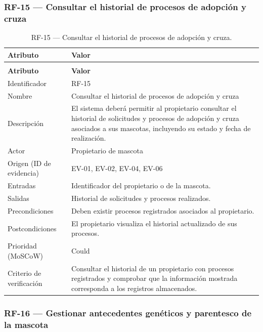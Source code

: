 \documentclass[journal,onecolumn]{IEEEtran}
\makeatletter
\newenvironment{atributos}[2]{%
	\small
	\begin{longtable}{@{}>{\raggedright\arraybackslash}p{4.2cm} >{\raggedright\arraybackslash}p{11.2cm}@{}}
		\caption{#2}\label{tab:#1}\\
		\toprule
		\textbf{Atributo} & \textbf{Valor} \\
		\midrule
		\endfirsthead
		\multicolumn{2}{@{}l}{\small\itshape (continuación)}\\
		\toprule
		\textbf{Atributo} & \textbf{Valor} \\
		\midrule
		\endhead
		\bottomrule
		\endlastfoot
	}{%
	\end{longtable}
	\normalsize
}
\makeatother
\begin{document}
	\subsubsection{RF-15 --- Consultar el historial de procesos de adopción y cruza}
	
	\begin{atributos}{RF-15}{RF-15 --- Consultar el historial de procesos de adopción y cruza.}
		Identificador & RF-15 \\
		Nombre & Consultar el historial de procesos de adopción y cruza \\
		Descripción & El sistema deberá permitir al propietario consultar el historial de solicitudes y procesos de adopción y cruza asociados a sus mascotas, incluyendo su estado y fecha de realización. \\
		Actor & Propietario de mascota \\
		Origen (ID de evidencia) & EV-01, EV-02, EV-04, EV-06 \\
		Entradas & Identificador del propietario o de la mascota. \\
		Salidas & Historial de solicitudes y procesos realizados. \\
		Precondiciones & Deben existir procesos registrados asociados al propietario. \\
		Postcondiciones & El propietario visualiza el historial actualizado de sus procesos. \\
		Prioridad (MoSCoW) & Could \\
		Criterio de verificación & Consultar el historial de un propietario con procesos registrados y comprobar que la información mostrada corresponda a los registros almacenados. \\
	\end{atributos}
	
	\subsubsection{RF-16 --- Gestionar antecedentes genéticos y parentesco de la mascota}
	
\end{document}
